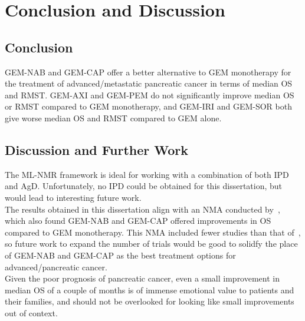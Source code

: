 \chapter{Conclusion and Discussion}

\section{Conclusion}
GEM-NAB and GEM-CAP offer a better alternative to GEM monotherapy for the treatment of advanced/metastatic pancreatic cancer in terms of median OS and RMST. GEM-AXI and GEM-PEM do not significantly improve median OS or RMST compared to GEM monotherapy, and GEM-IRI and GEM-SOR both give worse median OS and RMST compared to GEM alone. 

\section{Discussion and Further Work}
The ML-NMR framework is ideal for working with a combination of both IPD and AgD. Unfortunately, no IPD could be obtained for this dissertation, but would lead to interesting future work. \\

The results obtained in this dissertation align with an NMA conducted by~\cite{gresham2014}, which also found GEM-NAB and GEM-CAP offered improvements in OS compared to GEM monotherapy. This NMA included fewer studies than that of~\cite{gresham2014}, so future work to expand the number of trials would be good to solidfy the place of GEM-NAB and GEM-CAP as the best treatment options for advanced/pancreatic cancer. \\

Given the poor prognosis of pancreatic cancer, even a small improvement in median OS of a couple of months is of immense emotional value to patients and their families, and should not be overlooked for looking like small improvements out of context.